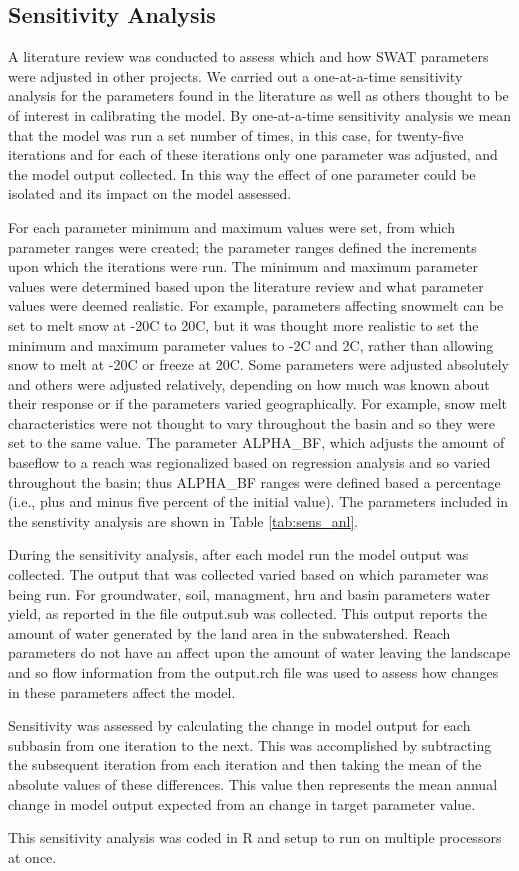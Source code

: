 \subsection{Sensitivity Analysis}
	A literature review was conducted to assess which and how SWAT parameters were adjusted in other projects. We carried out a one-at-a-time sensitivity analysis for the parameters found in the literature as well as others thought to be of interest in calibrating the model. By one-at-a-time sensitivity analysis we mean that the model was run a set number of times, in this case, for twenty-five iterations and for each of these iterations only one parameter was adjusted, and the model output collected. In this way the effect of one parameter could be isolated and its impact on the model assessed. 

	For each parameter minimum and maximum values were set, from which parameter ranges were created; the parameter ranges defined the increments upon which the iterations were run. The minimum and maximum parameter values were determined based upon the literature review and what parameter values were deemed realistic. For example, parameters affecting snowmelt can be set to melt snow at -20\degree C  to 20\degree C, but it was thought more realistic to set the minimum and maximum parameter values to -2\degree C  and 2\degree C, rather than allowing snow to melt at -20\degree C  or freeze at 20\degree C. Some parameters were adjusted absolutely and others were adjusted relatively, depending on how much was known about their response or if the parameters varied geographically. For example, snow melt characteristics were not thought to vary throughout the basin and so they were set to the same value. The parameter ALPHA\_BF, which adjusts the amount of baseflow to a reach was regionalized based on regression analysis and so varied throughout the basin; thus ALPHA\_BF ranges were defined based a percentage (i.e., plus and minus five percent of the initial value). The parameters included in the senstivity analysis are shown in Table \ref{tab:sens_anl}. 

	During the sensitivity analysis, after each model run the model output was collected. The output that was collected varied based on which parameter was being run. For groundwater, soil, managment, hru and basin parameters water yield, as reported in the file output.sub was collected. This output reports the amount of water generated by the land area in the subwatershed. Reach parameters do not have an affect upon the amount of water leaving the landscape and so flow information from the output.rch file was used to assess how changes in these parameters affect the model.
	
	Sensitivity was assessed by calculating the change in model output for each subbasin from one iteration to the next. This was accomplished by subtracting the subsequent iteration from each iteration and then taking the mean of the absolute values of these differences. This value then represents the mean annual change in model output expected from an change in target parameter value. 

	This sensitivity analysis was coded in R and setup to run on multiple processors at once.

\pagebreak